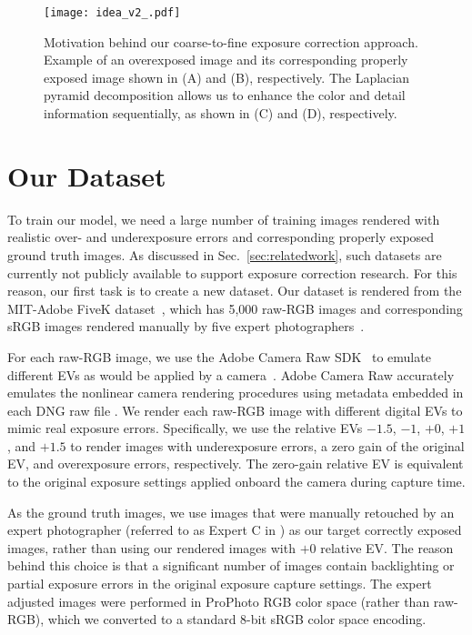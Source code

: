 \documentclass[final]{cvpr}
\begin{document}
\begin{figure}[t]
\centering
\texttt{[image: idea\_v2\_.pdf]}
\vspace{-6mm}
\caption{Motivation behind our coarse-to-fine exposure correction approach. Example of an overexposed image and its corresponding properly exposed image shown in (A) and (B), respectively. The Laplacian pyramid decomposition allows us to enhance the color and detail information sequentially, as shown in (C) and (D), respectively.\vspace{-4mm}}
\label{fig:idea}
\end{figure}

\section{Our Dataset} \label{subsec:data}

To train our model, we need a large number of training images rendered with realistic over-  and underexposure errors and corresponding properly exposed ground truth images.
As discussed in Sec.~\ref{sec:relatedwork}, such datasets are currently not publicly available to support exposure correction research. For this reason, our first task is to create a new dataset.  Our dataset is rendered from the MIT-Adobe FiveK dataset~\cite{fivek}, which has 5,000 raw-RGB images and corresponding sRGB images rendered manually by five expert photographers~\cite{fivek}.

For each raw-RGB image, we use the Adobe Camera Raw SDK~\cite{CameraRaw} to emulate different EVs as would be applied by a camera~\cite{schewe2010real}. Adobe Camera Raw accurately emulates the nonlinear camera rendering procedures using metadata embedded in each DNG raw file \cite{afifi2019color, schewe2010real}. We render each raw-RGB image with different digital EVs to mimic real exposure errors. Specifically, we use the  relative EVs $-1.5$, $-1$, $+0$, $+1$, and $+1.5$ to render images with underexposure errors, a zero gain of the original EV, and overexposure errors, respectively. The zero-gain relative EV is equivalent to the original exposure settings applied onboard the camera during capture time.

As the ground truth images, we use images that were manually retouched by an expert photographer (referred to as Expert C in \cite{fivek}) as our target correctly exposed images, rather than using our rendered images with $+0$ relative EV. The reason behind this choice is that a significant number of images contain backlighting or partial exposure errors in the original exposure capture settings. The expert adjusted images were performed in ProPhoto RGB color space \cite{fivek} (rather than raw-RGB), which we converted to a standard 8-bit sRGB color space encoding.
\end{document}
